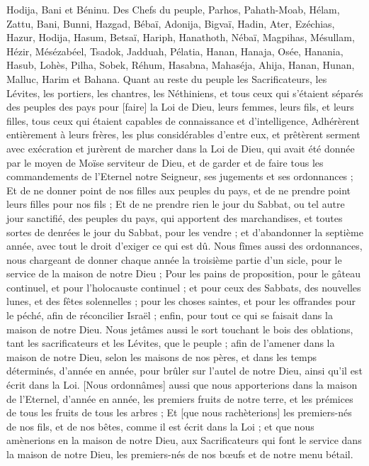 \begin{multicols}{2}
Hodija, Bani et Béninu.
Des Chefs du peuple, Parhos, Pahath-Moab, Hélam, Zattu, Bani,
Bunni, Hazgad, Bébaï,
Adonija, Bigvaï, Hadin,
Ater, Ezéchias, Hazur,
Hodija, Hasum, Betsaï,
Hariph, Hanathoth, Nébaï,
Magpihas, Mésullam, Hézir,
Mésézabéel, Tsadok, Jadduah,
Pélatia, Hanan, Hanaja,
Osée, Hanania, Hasub,
Lohès, Pilha, Sobek,
Réhum, Hasabna, Mahaséja,
Ahija, Hanan, Hunan,
Malluc, Harim et Bahana.
Quant au reste du peuple les Sacrificateurs, les Lévites, les portiers, les chantres, les Néthiniens, et tous ceux qui s'étaient séparés des peuples des pays pour [faire] la Loi de Dieu, leurs femmes, leurs fils, et leurs filles, tous ceux qui étaient capables de connaissance et d'intelligence,
Adhérèrent entièrement à leurs frères, les plus considérables d'entre eux, et prêtèrent serment avec exécration et jurèrent de marcher dans la Loi de Dieu, qui avait été donnée par le moyen de Moïse serviteur de Dieu, et de garder et de faire tous les commandements de l'Eternel notre Seigneur, ses jugements et ses ordonnances ;
Et de ne donner point de nos filles aux peuples du pays, et de ne prendre point leurs filles pour nos fils ;
Et de ne prendre rien le jour du Sabbat, ou tel autre jour sanctifié, des peuples du pays, qui apportent des marchandises, et toutes sortes de denrées le jour du Sabbat, pour les vendre ; et d'abandonner la septième année, avec tout le droit d'exiger ce qui est dû.
Nous fîmes aussi des ordonnances, nous chargeant de donner chaque année la troisième partie d'un sicle, pour le service de la maison de notre Dieu ;
Pour les pains de proposition, pour le gâteau continuel, et pour l'holocauste continuel ; et pour ceux des Sabbats, des nouvelles lunes, et des fêtes solennelles ; pour les choses saintes, et pour les offrandes pour le péché, afin de réconcilier Israël ; enfin, pour tout ce qui se faisait dans la maison de notre Dieu.
Nous jetâmes aussi le sort touchant le bois des oblations, tant les sacrificateurs et les Lévites, que le peuple ; afin de l'amener dans la maison de notre Dieu, selon les maisons de nos pères, et dans les temps déterminés, d'année en année, pour brûler sur l'autel de notre Dieu, ainsi qu'il est écrit dans la Loi.
[Nous ordonnâmes] aussi que nous apporterions dans la maison de l'Eternel, d'année en année, les premiers fruits de notre terre, et les prémices de tous les fruits de tous les arbres ;
Et [que nous rachèterions] les premiers-nés de nos fils, et de nos bêtes, comme il est écrit dans la Loi ; et que nous amènerions en la maison de notre Dieu, aux Sacrificateurs qui font le service dans la maison de notre Dieu, les premiers-nés de nos bœufs et de notre menu bétail.

\end{multicols}
